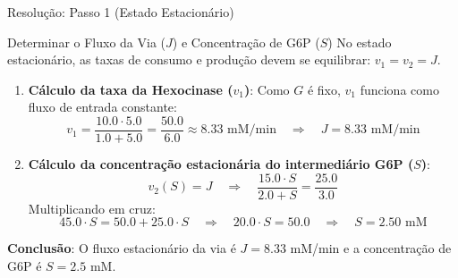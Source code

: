 \begin{frame}[shrink=10]{Resolução: Passo 1 (Estado Estacionário)}
\begin{block}{Determinar o Fluxo da Via ($J$) e Concentração de G6P ($S$)}
No estado estacionário, as taxas de consumo e produção devem se equilibrar: $v_1 = v_2 = J$.
\end{block}

\begin{enumerate}
    \item \textbf{Cálculo da taxa da Hexocinase ($v_1$)}:
    Como $G$ é fixo, $v_1$ funciona como fluxo de entrada constante:
    \begin{equation*}
    v_1 = \frac{10.0 \cdot 5.0}{1.0 + 5.0} = \frac{50.0}{6.0} \approx 8.33 \text{ mM/min} \quad \Rightarrow \quad J = 8.33 \text{ mM/min}
    \end{equation*}
    
    \item \textbf{Cálculo da concentração estacionária do intermediário G6P ($S$)}:
    \begin{equation*}
    v_2(S) = J \quad \Rightarrow \quad \frac{15.0 \cdot S}{2.0 + S} = \frac{25.0}{3.0}
    \end{equation*}
    Multiplicando em cruz:
    \begin{equation*}
    45.0 \cdot S = 50.0 + 25.0 \cdot S \quad \Rightarrow \quad 20.0 \cdot S = 50.0 \quad \Rightarrow \quad S = 2.50 \text{ mM}
    \end{equation*}
\end{enumerate}

\vspace{0.1cm}
\centering
\textcolor{azulescuro}{\textbf{Conclusão}: O fluxo estacionário da via é $J = 8.33$ mM/min e a concentração de G6P é $S = 2.5$ mM.}
\end{frame}

